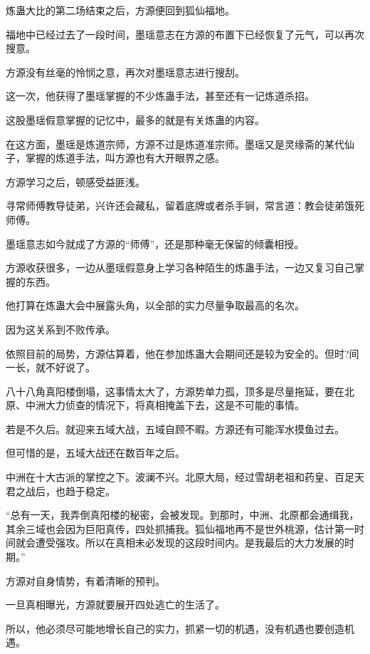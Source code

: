 
\begin{this_body}

炼蛊大比的第二场结束之后，方源便回到狐仙福地。

福地中已经过去了一段时间，墨瑶意志在方源的布置下已经恢复了元气，可以再次搜意。

方源没有丝毫的怜悯之意，再次对墨瑶意志进行搜刮。

这一次，他获得了墨瑶掌握的不少炼蛊手法，甚至还有一记炼道杀招。

这股墨瑶假意掌握的记忆中，最多的就是有关炼蛊的内容。

在这方面，墨瑶是炼道宗师，方源不过是炼道准宗师。墨瑶又是灵缘斋的某代仙子，掌握的炼道手法，叫方源也有大开眼界之感。

方源学习之后，顿感受益匪浅。

寻常师傅教导徒弟，兴许还会藏私，留着底牌或者杀手锏，常言道：教会徒弟饿死师傅。

墨瑶意志如今就成了方源的“师傅”，还是那种毫无保留的倾囊相授。

方源收获很多，一边从墨瑶假意身上学习各种陌生的炼蛊手法，一边又复习自己掌握的东西。

他打算在炼蛊大会中展露头角，以全部的实力尽量争取最高的名次。

因为这关系到不败传承。

依照目前的局势，方源估算着，他在参加炼蛊大会期间还是较为安全的。但时?间一长，就不好说了。

八十八角真阳楼倒塌，这事情太大了，方源势单力孤，顶多是尽量拖延，要在北原、中洲大力侦查的情况下，将真相掩盖下去，这是不可能的事情。

若是不久后。就迎来五域大战，五域自顾不暇。方源还有可能浑水摸鱼过去。

但可惜的是，五域大战还在数百年之后。

中洲在十大古派的掌控之下。波澜不兴。北原大局，经过雪胡老祖和药皇、百足天君之战后，也趋于稳定。

“总有一天，我弄倒真阳楼的秘密，会被发现。到那时，中洲、北原都会通缉我，其余三域也会因为巨阳真传，四处抓捕我。狐仙福地再不是世外桃源，估计第一时间就会遭受强攻。所以在真相未必发现的这段时间内。是我最后的大力发展的时期。”

方源对自身情势，有着清晰的预判。

一旦真相曝光，方源就要展开四处逃亡的生活了。

所以，他必须尽可能地增长自己的实力，抓紧一切的机遇，没有机遇也要创造机遇。


\end{this_body}
